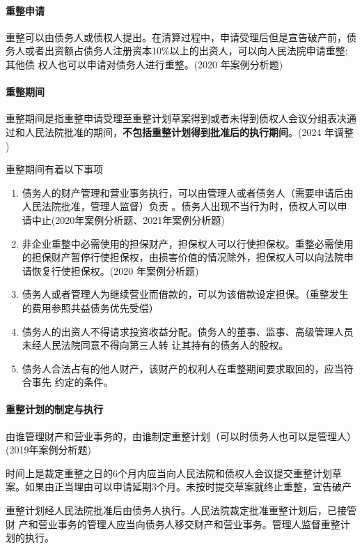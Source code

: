 \documentclass[UTF8,12pt]{ctexart}
\numberwithin{equation}{section} %
\numberwithin{figure}{section}
\numberwithin{table}{section}
\begin{document}
	\paragraph{重整申请}
	重整可以由债务人或债权人提出。在清算过程中，申请受理后但是宣告破产前，债务人或者出资额占债务人注册资本10\%以上的出资人，可以向人民法院申请重整;其他债 权人也可以申请对债务人进行重整。(2020 年案例分析题)
	
	\paragraph{重整期间}
	重整期间是指重整申请受理至重整计划草案得到或者未得到债权人会议分组表决通过和人民法院批准的期间，\textbf{不包括重整计划得到批准后的执行期间}。(2024 年调整 )
	
	重整期间有着以下事项
	\begin{enumerate}
		\item 债务人的财产管理和营业事务执行，可以由管理人或者债务人（需要申请后由人民法院批准，管理人监督）负责 。债务人出现不当行为时，债权人可以申请中止(2020年案例分析题、2021年案例分析题)
		
		\item 非企业重整中必需使用的担保财产，担保权人可以行使担保权。重整必需使用的担保财产暂停行使担保权，由损害价值的情况除外，担保权人可以向法院申请恢复行使担保权。(2020 年案例分析题)
		
		\item 债务人或者管理人为继续营业而借款的，可以为该借款设定担保。（重整发生的费用参照共益债务优先受偿）
		
		\item 债务人的出资人不得请求投资收益分配。债务人的董事、监事、高级管理人员未经人民法院同意不得向第三人转 让其持有的债务人的股权。
		
		\item 债务人合法占有的他人财产，该财产的权利人在重整期间要求取回的，应当符合事先 约定的条件。
	\end{enumerate}
	
	\paragraph{重整计划的制定与执行}
	由谁管理财产和营业事务的，由谁制定重整计划（可以时债务人也可以是管理人）(2019年案例分析题)
	
	时间上是裁定重整之日的6个月内应当向人民法院和债权人会议提交重整计划草案。如果由正当理由可以申请延期3个月。未按时提交草案就终止重整，宣告破产
	
	重整计划经人民法院批准后由债务人执行。人民法院裁定批准重整计划后，已接管财 产和营业事务的管理人应当向债务人移交财产和营业事务。管理人监督重整计划的执行。
	
\end{document}
